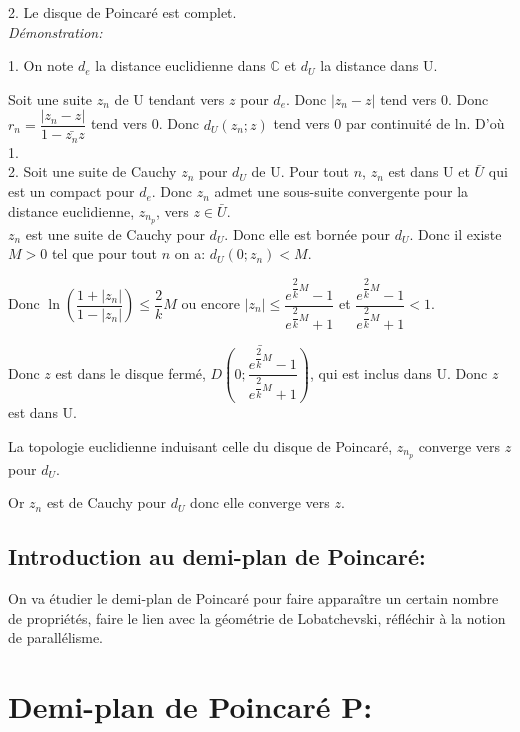 \documentclass[a4paper, 12pt, twoside]{book}
\begin{document}
  2. Le disque de Poincaré est complet.\\
  
  
  
  
  \textit{Démonstration:}
  
  1. On note $d_{e}$ la distance euclidienne dans $\mathbb{C}$ et $d_{U}$ la distance dans U.\
  
  Soit une suite $z_{n}$ de U tendant vers $z$ pour $d_{e}$. Donc $|z_{n}-z|$ tend vers 0. Donc $r_{n}=\dfrac{|z_{n}-z|}{1-\bar{z_{n}}z}$ tend vers 0. Donc $d_{U}(z_{n}; z)$ tend vers 0 par continuité de ln. D'où 1.\\
  
  2. Soit une suite de Cauchy  $z_{n}$ pour  $d_{U}$ de U. Pour tout $n$, $z_{n}$ est dans U et $\bar{U}$ qui est un compact pour $d_{e}$. Donc $z_{n}$ admet une sous-suite convergente pour la distance euclidienne, $z_{n_{p}}$, vers $z\in \bar{U}$.\\
  
  $z_{n}$ est une suite de Cauchy  pour  $d_{U}$. Donc elle est bornée pour $d_{U}$. Donc il existe $M>0$ tel que pour tout $n$ on a: $d_{U}(0; z_{n})<M$.\
  
Donc $\ln(\dfrac{1+|z_{n}|}{1-|z_{n}|})\leq \dfrac{2}{k}M$ ou encore $|z_{n}|\leq \dfrac{e^{\dfrac{2}{k}M}-1}{e^{\dfrac{2}{k}M}+1}$ et $\dfrac{e^{\dfrac{2}{k}M}-1}{e^{\dfrac{2}{k}M}+1}<1$. \

Donc $z$ est dans le disque fermé, $\bar{D(0;\dfrac{e^{\dfrac{2}{k}M}-1}{e^{\dfrac{2}{k}M}+1})}$, qui est inclus dans U. Donc $z$ est dans U.\

La topologie euclidienne induisant celle du disque de Poincaré, $z_{n_{p}}$ converge vers $z$ pour $d_{U}$.\

Or $z_{n}$ est de Cauchy pour $d_{U}$ donc elle converge vers $z$.\\


\section{Introduction au demi-plan de Poincaré:}

On va étudier le demi-plan de Poincaré pour faire apparaître un certain nombre de propriétés, faire le lien avec la géométrie de Lobatchevski, réfléchir à la notion de parallélisme.\\




\chapter{Demi-plan de Poincaré \textbf{P}:}
\end{document}
